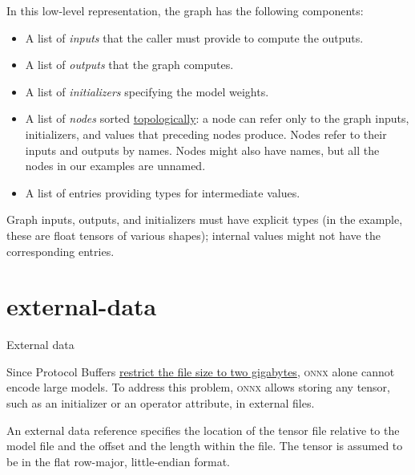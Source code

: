 \documentclass{article}
\begin{document}
In this low-level representation, the graph has the following components:
\begin{itemize}
\item A list of \emph{inputs} that the caller must provide to compute the outputs.
\item A list of \emph{outputs} that the graph computes.
\item A list of \emph{initializers} specifying the model weights.
\item A list of \emph{nodes} sorted \href{https://en.wikipedia.org/wiki/Topological_sorting}{topologically}: a node can refer only to the graph inputs, initializers, and values that preceding nodes produce.
    Nodes refer to their inputs and outputs by names.
    Nodes might also have names, but all the nodes in our examples are unnamed.
\item A list of  entries providing types for intermediate values.
\end{itemize}

Graph inputs, outputs, and initializers must have explicit types (in the example, these are float tensors of various shapes);
internal values might not have the corresponding  entries.

\section{external-data}{External data}

Since Protocol Buffers \href{https://protobuf.dev/programming-guides/proto-limits/#total}{restrict the file size to two gigabytes}, \textsc{onnx} alone cannot encode large models.
To address this problem, \textsc{onnx} allows storing any tensor, such as an initializer or an operator attribute, in external files.

An external data reference specifies the location of the tensor file relative to the model file and the offset and the length within the file.
The tensor is assumed to be in the flat row-major, little-endian format.
\end{document}
